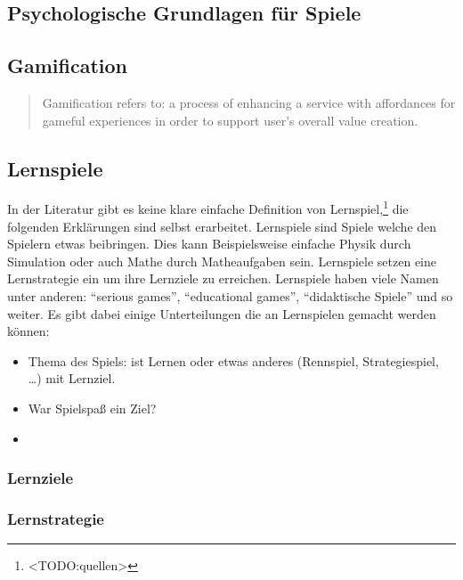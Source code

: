 \subsection{Psychologische Grundlagen für Spiele}
\subsection{Gamification}
	\begin{quote}
		\vspace{\baselineskip}\hfill\begin{minipage}{0.96\textwidth}
			Gamification refers to: a process of enhancing a service with affordances for gameful experiences in order to support user's overall value creation.
		\end{minipage}
	\end{quote}
\subsection{Lernspiele}
	In der Literatur gibt es keine klare einfache Definition von Lernspiel,\footnote{<TODO:quellen>} die folgenden Erklärungen sind selbst erarbeitet.
	Lernspiele sind Spiele welche den Spielern etwas beibringen. Dies kann Beispielsweise einfache Physik durch Simulation oder auch Mathe durch Matheaufgaben sein. Lernspiele setzen eine Lernstrategie ein um ihre Lernziele zu erreichen.
	Lernspiele haben viele Namen unter anderen: \enquote{serious games}, \enquote{educational games}, \enquote{didaktische Spiele} und so weiter.
	Es gibt dabei einige Unterteilungen die an Lernspielen gemacht werden können:
	\begin{itemize}
		\item{ Thema des Spiels: ist Lernen oder etwas anderes (Rennspiel, Strategiespiel, \dots) mit Lernziel. }
		\item{ War Spielspaß ein Ziel? }
		\item{  }
	\end{itemize}
	\subsubsection{Lernziele}
	\subsubsection{Lernstrategie}
